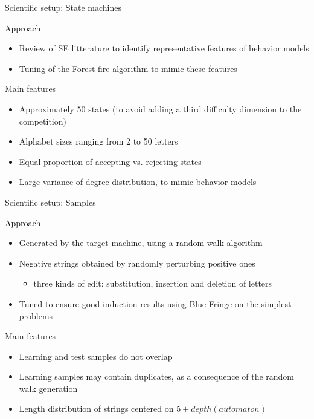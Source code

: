 \begin{frame}{Scientific setup: State machines}

  \begin{block}{Approach}
    \begin{itemize}
      \item Review of SE litterature to identify representative features of behavior models
      \item Tuning of the Forest-fire algorithm to mimic these features
    \end{itemize}
  \end{block}

  \begin{block}{Main features}
    \begin{itemize}
      \item Approximately 50 states (to avoid adding a third difficulty dimension to the competition)
      \item Alphabet sizes ranging from 2 to 50 letters
      \item Equal proportion of accepting vs. rejecting states
      \item Large variance of degree distribution, to mimic behavior models
    \end{itemize}
  \end{block}

\end{frame}

\begin{frame}{Scientific setup: Samples}

  \begin{block}{Approach}
    \begin{itemize}
      \item Generated by the target machine, using a random walk algorithm
      \item Negative strings obtained by randomly perturbing positive ones
      \begin{itemize}
        \item three kinds of edit: substitution, insertion and deletion of letters
      \end{itemize}
      \item Tuned to ensure good induction results using Blue-Fringe on the simplest 
            problems
    \end{itemize}
  \end{block}

  \begin{block}{Main features}
    \begin{itemize}
      \item Learning and test samples do not overlap
      \item Learning samples may contain duplicates, as a consequence of the random walk generation
      \item Length distribution of strings centered on $5 + depth(automaton)$
    \end{itemize}
  \end{block}

\end{frame}

